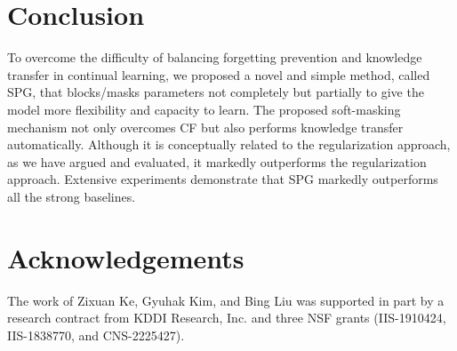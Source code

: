 \section{Conclusion} \label{sec:conclusion}

To overcome the difficulty of balancing forgetting prevention and knowledge transfer in continual learning, we proposed a novel and simple method, called SPG, that blocks/masks parameters not completely but partially to give the model more flexibility and capacity to learn. The proposed soft-masking mechanism not only overcomes CF but also performs knowledge transfer automatically. Although it is conceptually related to the regularization approach, as we have argued and evaluated, it markedly outperforms the regularization approach. 
Extensive experiments demonstrate that SPG markedly outperforms all the strong baselines. 

\section*{Acknowledgements}
The work of Zixuan Ke, Gyuhak Kim, and Bing Liu was supported in part by a research contract from KDDI Research, Inc. and three NSF grants (IIS-1910424, IIS-1838770, and CNS-2225427). 

